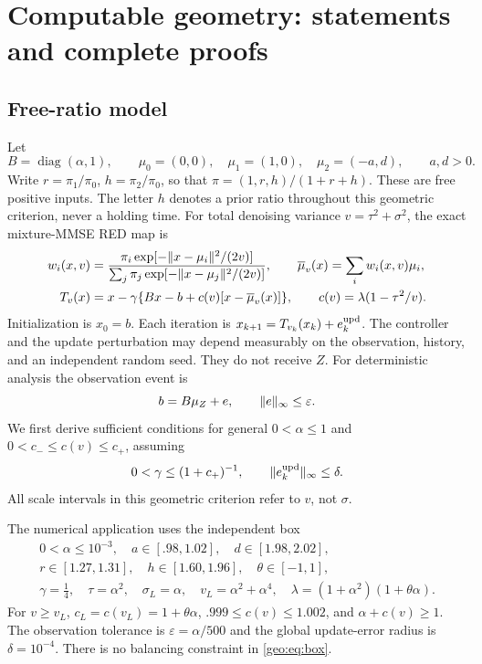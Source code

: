 \onecolumn
\section{Computable geometry: statements and complete proofs}\label{sec:geometry_full}
\subsection{Free-ratio model}
Let
\begin{equation}\label{geo:eq:model}
 B=\operatorname{diag}(\alpha,1),\qquad
 \mu_0=(0,0),\quad\mu_1=(1,0),\quad\mu_2=(-a,d),\qquad a,d>0.
\end{equation}
Write $r=\pi_1/\pi_0$, $h=\pi_2/\pi_0$, so that
$\pi=(1,r,h)/(1+r+h)$. These are free positive inputs. The letter $h$ denotes
a prior ratio throughout this geometric criterion, never a holding time. For total denoising
variance $v=\tau^2+\sigma^2$, the exact mixture-MMSE RED map is
\begin{align}
 w_i(x,v)&=\frac{\pi_i\exp[-\lVert x-\mu_i\rVert^2/(2v)]}
 {\sum_j\pi_j\exp[-\lVert x-\mu_j\rVert^2/(2v)]},\qquad
 \overline\mu_v(x)=\sum_iw_i(x,v)\mu_i,\label{geo:eq:weights}\\
 T_v(x)&=x-\gamma\{Bx-b+c(v)[x-\overline\mu_v(x)]\},\qquad
 c(v)=\lambda(1-\tau^2/v).\label{geo:eq:update}
\end{align}
Initialization is $x_0=b$. Each iteration is $x_{k+1}=T_{v_k}(x_k)+e_k^{\rm upd}$.
The controller and the update perturbation may depend measurably on the
observation, history, and an independent random seed. They do not receive $Z$.
For deterministic analysis the observation event is
\begin{equation}\label{geo:eq:obs}
 b=B\mu_Z+e,\qquad \lVert e\rVert_\infty\le\varepsilon.
\end{equation}
We first derive sufficient conditions for general $0<\alpha\le1$ and
$0<c_-\le c(v)\le c_+$, assuming
\begin{equation}\label{geo:eq:step}
 0<\gamma\le(1+c_+)^{-1},\qquad
 \lVert e_k^{\rm upd}\rVert_\infty\le\delta.
\end{equation}
All scale intervals in this geometric criterion refer to $v$, not $\sigma$.

The numerical application uses the independent box
\begin{equation}\label{geo:eq:box}
\begin{gathered}
0<\alpha\le10^{-3},\quad a\in[.98,1.02],\quad d\in[1.98,2.02],\\
r\in[1.27,1.31],\quad h\in[1.60,1.96],\quad\theta\in[-1,1],\\
\gamma=\tfrac14,\quad \tau=\alpha^2,\quad\sigma_L=\alpha,\quad
v_L=\alpha^2+\alpha^4,\quad\lambda=(1+\alpha^2)(1+\theta\alpha).
\end{gathered}
\end{equation}
For $v\ge v_L$, $c_L=c(v_L)=1+\theta\alpha$,
$.999\le c(v)\le1.002$, and $\alpha+c(v)\ge1$.
The observation tolerance is $\varepsilon=\alpha/500$ and the global update-error
radius is $\delta=10^{-4}$. There is no balancing constraint
in \eqref{geo:eq:box}.

